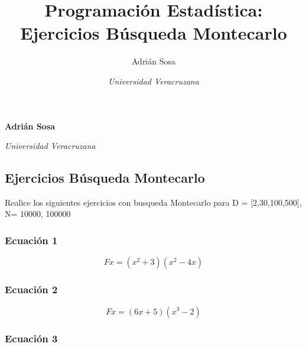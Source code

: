 \documentclass[11pt,]{article}
\title{Programación Estadística: Ejercicios Búsqueda Montecarlo  }
\author{\Large Adrián Sosa\vspace{0.05in} \newline\normalsize\emph{}   \and \Large \vspace{0.05in} \newline\normalsize\emph{Universidad Veracruzana}  }
\date{}
\newcommand*{\authorfont}{\fontfamily{phv}\selectfont}
\begin{document}
	
%

{%
\setlength{\parindent}{0pt}
\thispagestyle{plain}
{\fontsize{18}{20}\selectfont\raggedright 
\maketitle  %

}

{
   \vskip 13.5pt\relax \normalsize\fontsize{11}{12} 
\textbf{\authorfont Adrián Sosa} \hskip 15pt \emph{\small }   \par \textbf{\authorfont } \hskip 15pt \emph{\small Universidad Veracruzana}   
}

}






\vskip -8.5pt



\noindent  

\hypertarget{ejercicios-buxfasqueda-montecarlo}{%
\subsection{Ejercicios Búsqueda
Montecarlo}\label{ejercicios-buxfasqueda-montecarlo}}

Realice los siguientes ejercicios con busqueda Montecarlo para D =
{[}2,30,100,500{]}, N= 10000, 100000

\hypertarget{ecuaciuxf3n-1}{%
\subsubsection{Ecuación 1}\label{ecuaciuxf3n-1}}

\[Fx= (x^2 + 3)(x^2 - 4x) \]

\hypertarget{ecuaciuxf3n-2}{%
\subsubsection{Ecuación 2}\label{ecuaciuxf3n-2}}

\[Fx= (6x + 5)(x^3 - 2) \]

\hypertarget{ecuaciuxf3n-3}{%
\subsubsection{Ecuación 3}\label{ecuaciuxf3n-3}}
\end{document}
